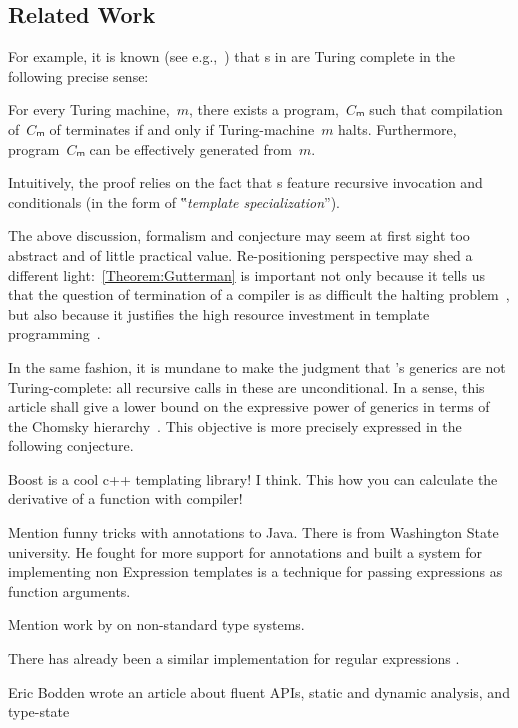 \subsection{Related Work}

For example, it is known (see e.g.,~\cite{Gutterman:2003}) that
  s in \CC are Turing complete in the following precise sense:

\begin{Theorem}
  \label{Theorem:Gutterman}
  For every Turing machine,~$m$, there exists a \CC program,~$Cₘ$ such that
    compilation of~$Cₘ$ of terminates if and only if
      Turing-machine~$m$ halts.
  Furthermore, program~$Cₘ$ can be effectively generated from~$m$.
\end{Theorem}

Intuitively, the proof relies on the fact that s
  feature recursive invocation and conditionals (in the form of
  ‟\emph{template specialization}”).

The above discussion, formalism and conjecture may seem at first sight too abstract
  and of little practical value.
Re-positioning perspective may shed a different light:~\cref{Theorem:Gutterman} is important not only because it tells us
  that the question of termination of a \CC compiler is as difficult
  the halting problem~\cite{Turing:1936}, but also because it
  justifies the high resource investment in
  template programming~\cite{Musser:Stepanov:1989,Dehnert:Stepanov:2000
  ,Backhouse:Jansson:1999, Austern:1998,Bracha:Odersky:Stoutamire:Wadler:98,X:Garcia:Jarvi:Lumsdaine:Siek:Willcock:03}.
  
In the same fashion, it is mundane to make the judgment that
  \Java's generics are not Turing-complete: all recursive calls
  in these are unconditional.
In a sense, this article shall give a lower bound on the
  expressive power of \Java generics in terms of the Chomsky hierarchy~\cite{Chomsky:1963}.
This objective is more precisely expressed in the following conjecture.

Boost is a cool c++ templating library!\cite{Abrahams:Gurtovoy:04} I think. 
This how you can calculate the derivative of a function with \CC compiler! \cite{Gil:Gutterman:98}

Mention funny tricks with annotations to Java. There is \cite{Papi:08} from 
  Washington State university. He fought for more support for annotations 
  and built a system for implementing non
Expression templates is a \CC technique for passing expressions as function arguments. \cite{Veldhuizen:95}

Mention work by \cite{Bracha} on non-standard type systems.  

There has already been a similar \Java implementation for regular expressions
  .

Eric Bodden wrote an article about fluent APIs, static and dynamic analysis, and type-state~\cite{Bodden:14}

